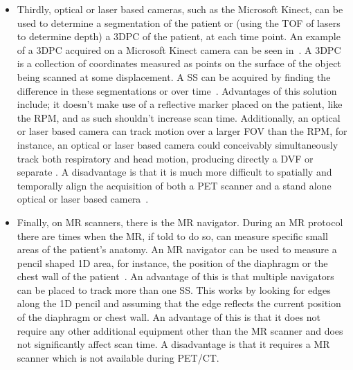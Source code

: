 \begin{itemize}
                    \item Thirdly, optical or laser based cameras, such as the Microsoft Kinect, can be used to determine a segmentation of the patient or (using the \gls{TOF} of lasers to determine depth) a \gls{3DPC} of the patient, at each time point. An example of a \gls{3DPC} acquired on a Microsoft Kinect camera can be seen in~. A \gls{3DPC} is a collection of coordinates measured as points on the surface of the object being scanned at some displacement. A \gls{SS} can be acquired by finding the difference in these segmentations or  over time~\parencite{Miranda2017MarkerlessAnimals}. Advantages of this solution include; it doesn't make use of a reflective marker placed on the patient, like the \gls{RPM}, and as such shouldn't increase scan time. Additionally, an optical or laser based camera can track motion over a larger \gls{FOV} than the \gls{RPM}, for instance, an optical or laser based camera could conceivably simultaneously track both respiratory and head motion, producing directly a \gls{DVF} or separate . A disadvantage is that it is much more difficult to spatially and temporally align the acquisition of both a \gls{PET} scanner and a stand alone optical or laser based camera~\parencite{Noonan2012AccurateKinect, Noonan2015RepurposingPET, Whitehead2018MotionPET/CT}.
                    
                    \item Finally, on \gls{MR} scanners, there is the \gls{MR} navigator. During an \gls{MR} protocol there are times when the \gls{MR}, if told to do so, can measure specific small areas of the patient's anatomy. An \gls{MR} navigator can be used to measure a pencil shaped \gls{1D} area, for instance, the position of the diaphragm or the chest wall of the patient~\parencite{Taylor1997MRAngiography}. An advantage of this is that multiple navigators can be placed to track more than one \gls{SS}. This works by looking for edges along the \gls{1D} pencil and assuming that the edge reflects the current position of the diaphragm or chest wall. An advantage of this is that it does not require any other additional equipment other than the \gls{MR} scanner and does not significantly affect scan time. A disadvantage is that it requires a \gls{MR} scanner which is not available during \gls{PET}/\gls{CT}.
                \end{itemize}
                
